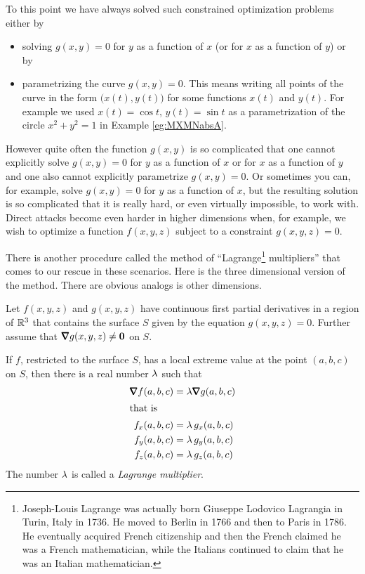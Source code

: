 To this point we have always solved such constrained optimization
problems either by
\begin{itemize} 
\item solving $g(x,y)=0$ for $y$ as a function of $x$ (or for
$x$ as a function of $y$) or by
\item parametrizing the curve $g(x,y)=0$. This means writing all points
of the curve in the form $\big(x(t), y(t)\big)$ for some functions $x(t)$
and $y(t)$. For example we used $x(t)=\cos t$, $y(t)=\sin t$ as 
a parametrization of the circle $x^2+y^2=1$ in Example \ref{eg:MXMNabsA}.
\end{itemize}
However quite often the function $g(x,y)$ is so complicated that 
one cannot explicitly solve $g(x,y)=0$ for $y$ as a function  of $x$ or 
for $x$ as a function of $y$ and one also cannot explicitly 
parametrize $g(x,y)=0$. Or sometimes you can, for example, solve $g(x,y)=0$ 
for $y$ as a function of $x$, but the resulting solution is so 
complicated that it is really hard, or even virtually impossible, to work 
with. Direct attacks become even harder in higher dimensions when, for example,
we wish to optimize a function $f(x,y,z)$ subject to a constraint 
$g(x,y,z)=0$. 

There is another procedure called the method of 
``Lagrange\footnote{Joseph-Louis Lagrange was actually born 
Giuseppe Lodovico Lagrangia in Turin, Italy in 1736. He moved to Berlin
in 1766 and then to Paris in 1786. He eventually acquired French citizenship
and then the French claimed he was a French mathematician, while the 
Italians continued to claim that he was an Italian mathematician.

} multipliers''
that comes to our rescue in these scenarios. Here is the three dimensional
version of the method. There are obvious analogs is other dimensions.

\begin{theorem}\label{thm Lagrange}
Let $f(x,y,z)$ and $g(x,y,z)$  have continuous first partial derivatives in a 
region of $\mathbb{R}^3$ that contains the surface $S$ given by the equation 
$g(x,y,z)=0$. Further assume that $\vnabla g(x,y,z)\ne\vZero$ on $S$. 

\medskip

If $f$, restricted 
to the surface $S$, has a local extreme value at the point $(a,b,c)$ on $S$, 
then there is a real number $\lambda$ such that
\begin{align*}
\vnabla f(a,b,c) &= \la\vnabla g(a,b,c) \\
\intertext{that is}
f_x(a,b,c) &= \la\, g_x(a,b,c)\\
f_y(a,b,c) &= \la\, g_y(a,b,c)\\
f_z(a,b,c) &= \la\, g_z(a,b,c)
\end{align*}
The number $\lambda$ is called a \emph{Lagrange multiplier}.
\end{theorem}

